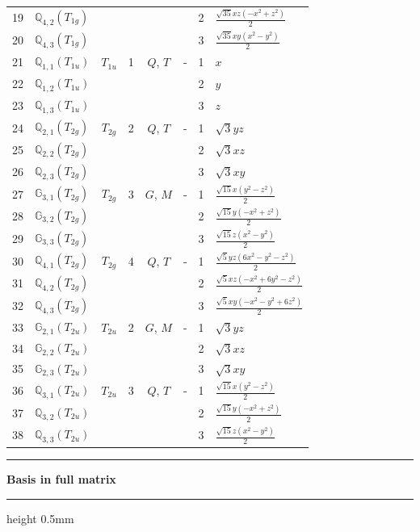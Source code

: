 \documentclass[fleqn,10pt,landscape]{jsarticle}
\begin{document}
\begin{longtable}[l]{clcccccl}
19 & $\mathbb{Q}_{4,2}(T_{1g})$ &  &  &  &  & 2 & $\frac{\sqrt{35} x z \left(- x^{2} + z^{2}\right)}{2}$ \\
20 & $\mathbb{Q}_{4,3}(T_{1g})$ &  &  &  &  & 3 & $\frac{\sqrt{35} x y \left(x^{2} - y^{2}\right)}{2}$ \\ \hline
21 & $\mathbb{Q}_{1,1}(T_{1u})$ & $T_{1u}$ & 1 & $Q$, $T$ & - & 1 & $x$ \\
22 & $\mathbb{Q}_{1,2}(T_{1u})$ &  &  &  &  & 2 & $y$ \\
23 & $\mathbb{Q}_{1,3}(T_{1u})$ &  &  &  &  & 3 & $z$ \\ \hline
24 & $\mathbb{Q}_{2,1}(T_{2g})$ & $T_{2g}$ & 2 & $Q$, $T$ & - & 1 & $\sqrt{3} y z$ \\
25 & $\mathbb{Q}_{2,2}(T_{2g})$ &  &  &  &  & 2 & $\sqrt{3} x z$ \\
26 & $\mathbb{Q}_{2,3}(T_{2g})$ &  &  &  &  & 3 & $\sqrt{3} x y$ \\ \hline
27 & $\mathbb{G}_{3,1}(T_{2g})$ & $T_{2g}$ & 3 & $G$, $M$ & - & 1 & $\frac{\sqrt{15} x \left(y^{2} - z^{2}\right)}{2}$ \\
28 & $\mathbb{G}_{3,2}(T_{2g})$ &  &  &  &  & 2 & $\frac{\sqrt{15} y \left(- x^{2} + z^{2}\right)}{2}$ \\
29 & $\mathbb{G}_{3,3}(T_{2g})$ &  &  &  &  & 3 & $\frac{\sqrt{15} z \left(x^{2} - y^{2}\right)}{2}$ \\ \hline
30 & $\mathbb{Q}_{4,1}(T_{2g})$ & $T_{2g}$ & 4 & $Q$, $T$ & - & 1 & $\frac{\sqrt{5} y z \left(6 x^{2} - y^{2} - z^{2}\right)}{2}$ \\
31 & $\mathbb{Q}_{4,2}(T_{2g})$ &  &  &  &  & 2 & $\frac{\sqrt{5} x z \left(- x^{2} + 6 y^{2} - z^{2}\right)}{2}$ \\
32 & $\mathbb{Q}_{4,3}(T_{2g})$ &  &  &  &  & 3 & $\frac{\sqrt{5} x y \left(- x^{2} - y^{2} + 6 z^{2}\right)}{2}$ \\ \hline
33 & $\mathbb{G}_{2,1}(T_{2u})$ & $T_{2u}$ & 2 & $G$, $M$ & - & 1 & $\sqrt{3} y z$ \\
34 & $\mathbb{G}_{2,2}(T_{2u})$ &  &  &  &  & 2 & $\sqrt{3} x z$ \\
35 & $\mathbb{G}_{2,3}(T_{2u})$ &  &  &  &  & 3 & $\sqrt{3} x y$ \\ \hline
36 & $\mathbb{Q}_{3,1}(T_{2u})$ & $T_{2u}$ & 3 & $Q$, $T$ & - & 1 & $\frac{\sqrt{15} x \left(y^{2} - z^{2}\right)}{2}$ \\
37 & $\mathbb{Q}_{3,2}(T_{2u})$ &  &  &  &  & 2 & $\frac{\sqrt{15} y \left(- x^{2} + z^{2}\right)}{2}$ \\
38 & $\mathbb{Q}_{3,3}(T_{2u})$ &  &  &  &  & 3 & $\frac{\sqrt{15} z \left(x^{2} - y^{2}\right)}{2}$ \\
\end{longtable}
\vspace{5mm}
\noindent \rule[0.5mm]{5mm}{0.5mm}\hspace{3mm}\textbf{Basis in full matrix}\hspace{3mm}\leaders\hrule height 0.5mm\hfill\kern0pt
\vspace{3mm}
\end{document}
